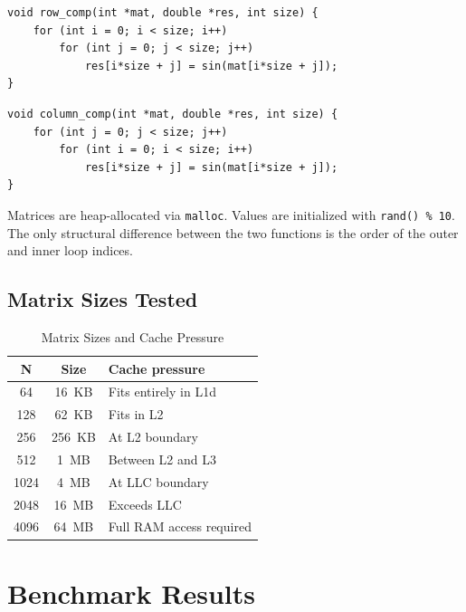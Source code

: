 \documentclass[conference]{IEEEtran}
\begin{document}
\begin{lstlisting}[style=cstyle, caption={Row-major traversal (cache-friendly)},
label={lst:row}]
void row_comp(int *mat, double *res, int size) {
    for (int i = 0; i < size; i++)
        for (int j = 0; j < size; j++)
            res[i*size + j] = sin(mat[i*size + j]);
}
\end{lstlisting}

\begin{lstlisting}[style=cstyle,
caption={Column-major traversal (cache-unfriendly)}, label={lst:col}]
void column_comp(int *mat, double *res, int size) {
    for (int j = 0; j < size; j++)
        for (int i = 0; i < size; i++)
            res[i*size + j] = sin(mat[i*size + j]);
}
\end{lstlisting}

Matrices are heap-allocated via \texttt{malloc}. Values are initialized with
\texttt{rand() \% 10}. The only structural difference between the two functions
is the order of the outer and inner loop indices.

\subsection{Matrix Sizes Tested}

\begin{table}[H]
\caption{Matrix Sizes and Cache Pressure}
\label{tab:sizes}
\centering
\begin{tabular}{ccl}
\toprule
\textbf{N} & \textbf{Size} & \textbf{Cache pressure} \\
\midrule
64   & 16~KB  & Fits entirely in L1d     \\
128  & 62~KB  & Fits in L2               \\
256  & 256~KB & At L2 boundary           \\
512  & 1~MB   & Between L2 and L3        \\
1024 & 4~MB   & At LLC boundary          \\
2048 & 16~MB  & Exceeds LLC              \\
4096 & 64~MB  & Full RAM access required \\
\bottomrule
\end{tabular}
\end{table}

\section{Benchmark Results}
\label{sec:results}
\end{document}
